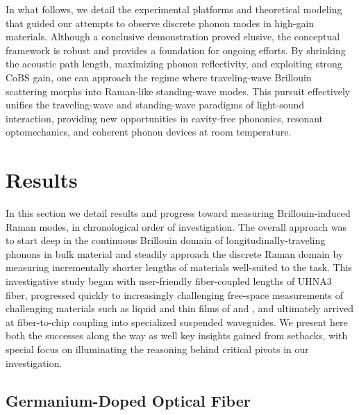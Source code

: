 In what follows, we detail the experimental platforms and theoretical modeling that guided our attempts to observe discrete phonon modes in high-gain materials. Although a conclusive demonstration proved elusive, the conceptual framework is robust and provides a foundation for ongoing efforts. By shrinking the acoustic path length, maximizing phonon reflectivity, and exploiting strong \ac{CoBS} gain, one can approach the regime where traveling-wave Brillouin scattering morphs into Raman-like standing-wave modes. This pursuit effectively unifies the traveling-wave and standing-wave paradigms of light-sound interaction, providing new opportunities in cavity-free phononics, resonant optomechanics, and coherent phonon devices at room temperature.


\section{Results}
\label{sec:Raman:Results}

In this section we detail results and progress toward measuring Brillouin-induced Raman modes, in chronological order of investigation. The overall approach was to start deep in the continuous Brillouin domain of longitudinally-traveling phonons in bulk material and steadily approach the discrete Raman domain by measuring incrementally shorter lengths of materials well-suited to the task. This investigative study began with user-friendly fiber-coupled lengths of \ac{UHNA3} fiber, progressed quickly to increasingly challenging free-space measurements of challenging materials such as liquid  and thin films of  and , and ultimately arrived at fiber-to-chip coupling into specialized suspended waveguides. We present here both the successes along the way as well key insights gained from setbacks, with special focus on illuminating the reasoning behind critical pivots in our investigation.

\subsection{Germanium-Doped Optical Fiber}
\label{subsec:Raman:Target:UHNA3}

